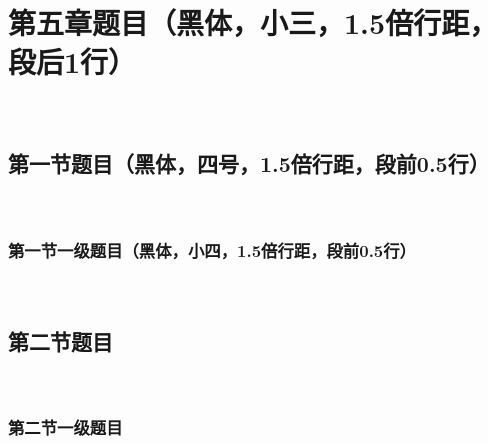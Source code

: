 
\chapter{第五章题目（黑体，小三，1.5倍行距，段后1行）}
\label{chap05}
~\\
\section{第一节题目（黑体，四号，1.5倍行距，段前0.5行）}
~\\
\subsection{第一节一级题目（黑体，小四，1.5倍行距，段前0.5行）}
~\\
\section{第二节题目}
~\\
\subsection{第二节一级题目}
~\\
